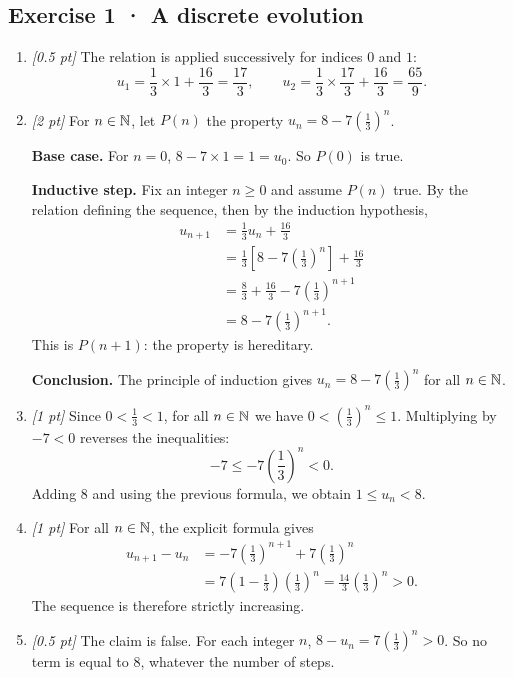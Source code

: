\subsection*{Exercise 1 · A discrete evolution}\begin{enumerate}

\item \textit{[0.5 pt]} The relation is applied successively for indices $0$ and $1$:\[u_1=\frac{1}{3}\times 1+\frac{16}{3}=\frac{17}{3},\qquad u_2=\frac{1}{3}\times \frac{17}{3}+\frac{16}{3}=\frac{65}{9}.\]

\item \textit{[2 pt]} For $n\in\mathbb N$, let $P(n)$ the property $u_n=8-7\left(\frac{1}{3}\right)^n$.
\par\smallskip\textbf{Base case.} For $n=0$, $8-7\times1=1=u_0$. So $P(0)$ is true.
\par\smallskip\textbf{Inductive step.} Fix an integer $n\ge0$ and assume $P(n)$ true. By the relation defining the sequence, then by the induction hypothesis,
\[\begin{aligned}u_{n+1}&=\frac{1}{3}u_n+\frac{16}{3}\\
&=\frac{1}{3}\left[8-7\left(\frac{1}{3}\right)^n\right]+\frac{16}{3}\\
&=\frac{8}{3}+\frac{16}{3}-7\left(\frac{1}{3}\right)^{n+1}\\
&=8-7\left(\frac{1}{3}\right)^{n+1}.
\end{aligned}\]
This is $P(n+1)$: the property is hereditary.
\par\smallskip\textbf{Conclusion.} The principle of induction gives $u_n=8-7\left(\frac{1}{3}\right)^n$ for all $n\in\mathbb N$.

\item \textit{[1 pt]} Since $0<\frac{1}{3}<1$, for all $n\in\mathbb N$ we have $0<(\frac{1}{3})^n\le1$. Multiplying by $-7<0$ reverses the inequalities:
\[-7\le-7(\frac{1}{3})^n<0.\]
Adding $8$ and using the previous formula, we obtain $1\le u_n<8$.

\item \textit{[1 pt]} For all $n\in\mathbb N$, the explicit formula gives
\[\begin{aligned}u_{n+1}-u_n&=-7(\frac{1}{3})^{n+1}+7(\frac{1}{3})^n\\&=7(1-\frac{1}{3})(\frac{1}{3})^n=\frac{14}{3}(\frac{1}{3})^n>0.\end{aligned}\]
The sequence is therefore strictly increasing.

\item \textit{[0.5 pt]} The claim is false. For each integer $n$, $8-u_n=7(\frac{1}{3})^n>0$. So no term is equal to $8$, whatever the number of steps.

\end{enumerate}

